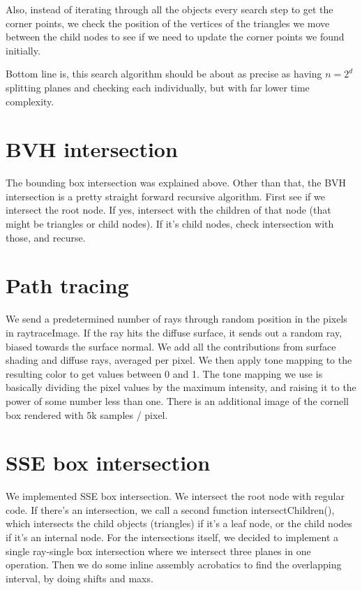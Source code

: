 \documentclass{article} %
\begin{document}
Also, instead of iterating through all the objects every search step to get the corner points, we check the position of the vertices of the triangles we move between the child nodes to see if we need to update the corner points we found initially.

Bottom line is, this search algorithm should be about as precise as having $n=2^d$ splitting planes and checking each individually, but with far lower time complexity.

\section{BVH intersection}
The bounding box intersection was explained above. Other than that, the BVH intersection is a pretty straight forward recursive algorithm. First see if we intersect the root node. If yes, intersect with the children of that node (that might be triangles or child nodes). If it's child nodes, check intersection with those, and recurse.

\section{Path tracing}
We send a predetermined number of rays through random position in the pixels in raytraceImage. If the ray hits the diffuse surface, it sends out a random ray, biased towards the surface normal. We add all the contributions from surface shading and diffuse rays, averaged per pixel. We then apply tone mapping to the resulting color to get values between 0 and 1. The tone mapping we use is basically dividing the pixel values by the maximum intensity, and raising it to the power of some number less than one. There is an additional image of the cornell box rendered with 5k samples / pixel.

\section{SSE box intersection}
We implemented SSE box intersection. We intersect the root node with regular code. If there's an intersection, we call a second function intersectChildren(), which intersects the child objects (triangles) if it's a leaf node, or the child nodes if it's an internal node. For the intersections itself, we decided to implement a single ray-single box intersection where we intersect three planes in one operation. Then we do some inline assembly acrobatics to find the overlapping interval, by doing shifts and maxs.
\end{document}

